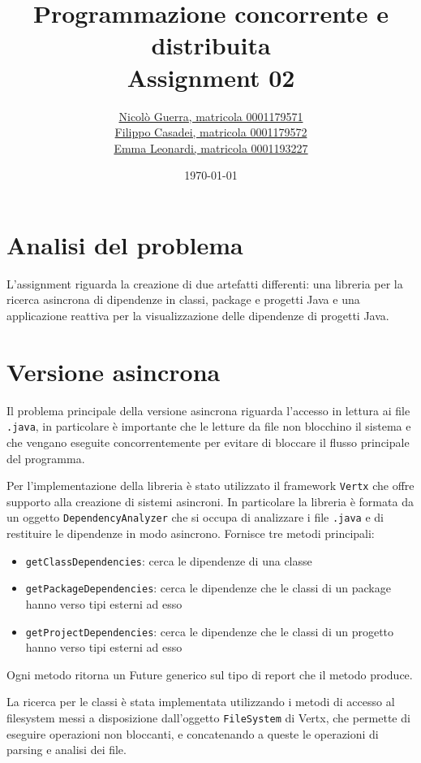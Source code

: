 \documentclass[11pt,notitlepage]{article}
\title{Programmazione concorrente e distribuita \\ Assignment 02}
\author{
    \href{mailto:nicolo.guerra@studio.unibo.it}{Nicolò Guerra, matricola 0001179571} \\
    \href{mailto:filippo.casadei9@studio.unibo.it}{Filippo Casadei, matricola 0001179572} \\
    \href{mailto:emma.leonardi2@studio.unibo.it}{Emma Leonardi, matricola 0001193227}
    }
\date{\today}
\begin{document}
\maketitle
\renewcommand{\thesection}{\arabic{section}}
\section{Analisi del problema}

L'assignment riguarda la creazione di due artefatti differenti: una libreria per la ricerca asincrona di dipendenze in classi, package e progetti Java e una applicazione
reattiva per la visualizzazione delle dipendenze di progetti Java.

\section{Versione asincrona}
Il problema principale della versione asincrona riguarda l'accesso in lettura ai file \texttt{.java}, in particolare è importante che le letture da file non blocchino 
il sistema e che vengano eseguite concorrentemente per evitare di bloccare il flusso principale del programma.

Per l'implementazione della libreria è stato utilizzato il framework \texttt{Vertx} che offre supporto alla creazione di sistemi asincroni. In particolare la libreria è formata 
da un oggetto \texttt{DependencyAnalyzer} che si occupa di analizzare i file \texttt{.java} e di restituire le dipendenze in modo asincrono. Fornisce tre metodi principali:
\begin{itemize}
    \item \texttt{getClassDependencies}: cerca le dipendenze di una classe
    \item \texttt{getPackageDependencies}: cerca le dipendenze che le classi di un package hanno verso tipi esterni ad esso
    \item \texttt{getProjectDependencies}: cerca le dipendenze che le classi di un progetto hanno verso tipi esterni ad esso
\end{itemize}
Ogni metodo ritorna un Future generico sul tipo di report che il metodo produce.

La ricerca per le classi è stata implementata utilizzando i metodi di accesso al filesystem messi a disposizione dall'oggetto \texttt{FileSystem} di Vertx, che 
permette di eseguire operazioni non bloccanti, e concatenando a queste le operazioni di parsing e analisi dei file.
\end{document}
